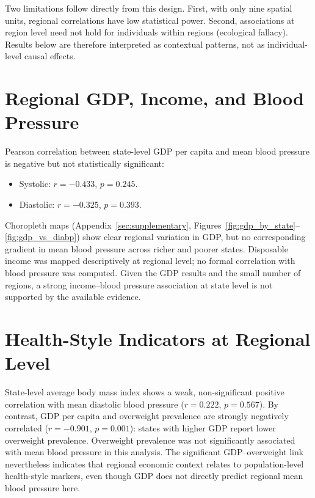 Two limitations follow directly from this design. First, with only nine spatial units, regional correlations have low statistical power. Second, associations at region level need not hold for individuals within regions (ecological fallacy). Results below are therefore interpreted as contextual patterns, not as individual-level causal effects.

\section{Regional GDP, Income, and Blood Pressure}
\label{sec:spatial_gdp}

Pearson correlation between state-level GDP per capita and mean blood pressure is negative but not statistically significant:
\begin{itemize}
    \item Systolic: $r = -0.433$, $p = 0.245$.
    \item Diastolic: $r = -0.325$, $p = 0.393$.
\end{itemize}

Choropleth maps (Appendix~\ref{sec:supplementary}, Figures~\ref{fig:gdp_by_state}--\ref{fig:gdp_vs_diabp}) show clear regional variation in GDP, but no corresponding gradient in mean blood pressure across richer and poorer states. Disposable income was mapped descriptively at regional level; no formal correlation with blood pressure was computed. Given the GDP results and the small number of regions, a strong income--blood pressure association at state level is not supported by the available evidence.

\section{Health-Style Indicators at Regional Level}
\label{sec:spatial_health}

State-level average body mass index shows a weak, non-significant positive correlation with mean diastolic blood pressure ($r = 0.222$, $p = 0.567$). By contrast, GDP per capita and overweight prevalence are strongly negatively correlated ($r = -0.901$, $p = 0.001$): states with higher GDP report lower overweight prevalence. Overweight prevalence was not significantly associated with mean blood pressure in this analysis. The significant GDP--overweight link nevertheless indicates that regional economic context relates to population-level health-style markers, even though GDP does not directly predict regional mean blood pressure here.

